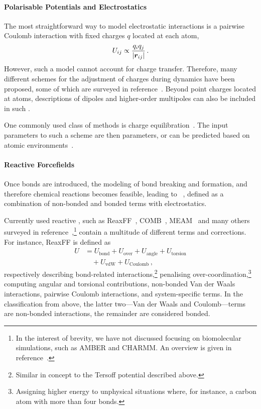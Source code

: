\paragraph{Polarisable Potentials and Electrostatics} The most straightforward way to model electrostatic interactions is a pairwise Coulomb interaction with fixed charges $q$ located at each atom,
\begin{equation}
	U_{ij} \propto \frac{q_i q_j}{|\boldsymbol{r}_{ij}|} \, .
\end{equation}
However, such a model cannot account for charge transfer. Therefore, many different schemes for the adjustment of charges during dynamics have been proposed, some of which are surveyed in reference~\cite{cddw2009p}. Beyond point charges located at atoms, descriptions of dipoles and higher-order multipoles can also be included in such  \ffs. 

One commonly used class of methods is charge equilibration~\cite{mgs1986p,rg1991p}. The input parameters to such a scheme are then \ff parameters, or can be predicted based on atomic environments~\cite{b2021q}.

\paragraph{Reactive Forcefields} Once bonds are introduced, the modeling of bond breaking and formation, and therefore chemical reactions becomes feasible, leading to  \ffs~\cite{psaa2015p}, defined as a combination of non-bonded and bonded terms with electrostatics.

Currently used reactive \ffs, such as ReaxFF~\cite{ddlg2001p,shgd2016p}, COMB~\cite{ysp2007p,ldps2012p}, MEAM~\cite{b1987p} and many others surveyed in reference~\cite{psaa2015p},\footnote{In the interest of brevity, we have not discussed \ffs focusing on biomolecular simulations, such as AMBER and CHARMM. An overview is given in reference~\cite{pc2003p}.} contain a multitude of different terms and corrections. For instance, ReaxFF is defined as~\cite{shgd2016p}
\begin{align}
	U &= U_{\text{bond}} + U_{\text{over}} + U_{\text{angle}} + U_{\text{torsion}} \\
	  &\quad+ U_{\text{vdW}} + U_{\text{Coulomb}} \, ,
\end{align}
respectively describing bond-related interactions,\footnote{Similar in concept to the Tersoff potential described above.} penalising over-coordination,\footnote{Assigning higher energy to unphysical situations where, for instance, a carbon atom with more than four bonds.} computing angular and torsional contributions, non-bonded Van der Waals interactions, pairwise Coulomb interactions, and system-specific terms. In the classification from above, the latter two---Van der Waals and Coulomb---terms are non-bonded interactions, the remainder are considered bonded.


